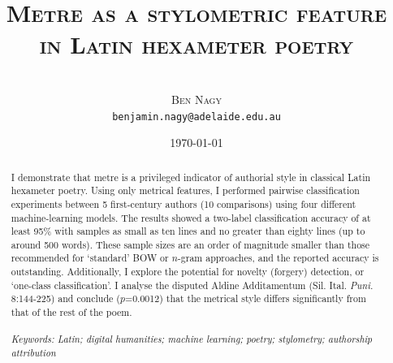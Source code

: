 \documentclass[11pt,a4paper]{scrartcl} %
\begin{document}
\title{\rmfamily\normalfont\textsc{Metre as a stylometric feature in Latin hexameter poetry}}
\author{\phantom{xxx}\\\textsc{Ben Nagy}\\\small{\texttt{benjamin.nagy@adelaide.edu.au}}}
\date{\normalsize{\today}}

\maketitle

\begin{abstract}
\noindent
I demonstrate that metre is a privileged indicator of authorial style in classical Latin hexameter poetry. Using only metrical features, I performed pairwise classification experiments between 5 first-century authors (10 comparisons) using four different machine-learning models. The results showed a two-label classification accuracy of at least 95\% with samples as small as ten lines and no greater than eighty lines (up to around 500 words). These sample sizes are an order of magnitude smaller than those recommended for `standard' BOW or $n$-gram approaches, and the reported accuracy is outstanding. Additionally, I explore the potential for novelty (forgery) detection, or `one-class classification'. I analyse the disputed Aldine Additamentum (Sil. Ital. \textit{Puni.} 8:144-225) and conclude ($p$=0.0012) that the metrical style differs significantly from that of the rest of the poem.\\
\phantom{xxx}\\
\noindent\textit{Keywords: Latin; digital humanities; machine learning; poetry; stylometry; authorship attribution}
\end{abstract}

\setlength{\parindent}{0.3in}
\end{document}
